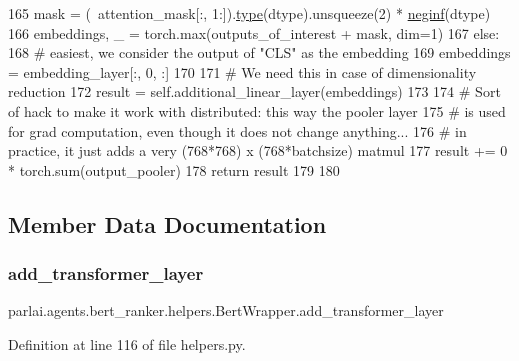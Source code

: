 \begin{DoxyCode}
165             mask = (~attention\_mask[:, 1:]).\hyperlink{namespaceparlai_1_1agents_1_1tfidf__retriever_1_1build__tfidf_ad5dfae268e23f506da084a9efb72f619}{type}(dtype).unsqueeze(2) * 
      \hyperlink{namespaceparlai_1_1utils_1_1misc_a68c44ca571de7149b683539db659c330}{neginf}(dtype)
166             embeddings, \_ = torch.max(outputs\_of\_interest + mask, dim=1)
167         \textcolor{keywordflow}{else}:
168             \textcolor{comment}{# easiest, we consider the output of "CLS" as the embedding}
169             embeddings = embedding\_layer[:, 0, :]
170 
171         \textcolor{comment}{# We need this in case of dimensionality reduction}
172         result = self.additional\_linear\_layer(embeddings)
173 
174         \textcolor{comment}{# Sort of hack to make it work with distributed: this way the pooler layer}
175         \textcolor{comment}{# is used for grad computation, even though it does not change anything...}
176         \textcolor{comment}{# in practice, it just adds a very (768*768) x (768*batchsize) matmul}
177         result += 0 * torch.sum(output\_pooler)
178         \textcolor{keywordflow}{return} result
179 
180 
\end{DoxyCode}


\subsection{Member Data Documentation}
\mbox{\label{classparlai_1_1agents_1_1bert__ranker_1_1helpers_1_1BertWrapper_ae1ec954dac72452d7b156a15f488c024}} 
\subsubsection{\texorpdfstring{add\+\_\+transformer\+\_\+layer}{add\_transformer\_layer}}
{\footnotesize\ttfamily parlai.\+agents.\+bert\+\_\+ranker.\+helpers.\+Bert\+Wrapper.\+add\+\_\+transformer\+\_\+layer}



Definition at line 116 of file helpers.\+py.

